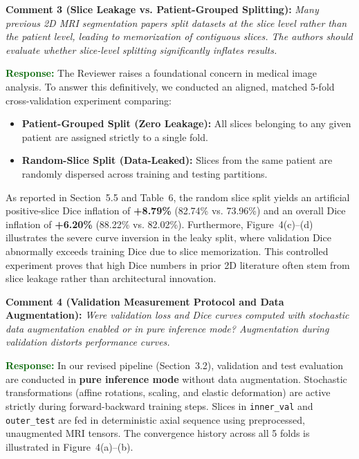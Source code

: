 \documentclass[11pt]{article}
\newcommand{\commentbox}[2]{%
\vspace{0.42em}\noindent
\textbf{\textcolor{NavyBlue}{#1:}} \textit{#2}\vspace{0.18em}%
}
\newcommand{\responsebox}[1]{%
\noindent
\textbf{\textcolor{DarkGreen}{Response:}} #1\vspace{0.42em}%
}
\begin{document}
\commentbox{Comment 3 (Slice Leakage vs. Patient-Grouped Splitting)}{Many previous 2D MRI segmentation papers split datasets at the slice level rather than the patient level, leading to memorization of contiguous slices. The authors should evaluate whether slice-level splitting significantly inflates results.}
\responsebox{The Reviewer raises a foundational concern in medical image analysis. To answer this definitively, we conducted an aligned, matched 5-fold cross-validation experiment comparing:
\begin{itemize}
    \item \textbf{Patient-Grouped Split (Zero Leakage):} All slices belonging to any given patient are assigned strictly to a single fold.
    \item \textbf{Random-Slice Split (Data-Leaked):} Slices from the same patient are randomly dispersed across training and testing partitions.
\end{itemize}
As reported in Section~5.5 and Table~6, the random slice split yields an artificial positive-slice Dice inflation of \textbf{+8.79\%} (82.74\% vs. 73.96\%) and an overall Dice inflation of \textbf{+6.20\%} (88.22\% vs. 82.02\%). Furthermore, Figure~4(c)--(d) illustrates the severe curve inversion in the leaky split, where validation Dice abnormally exceeds training Dice due to slice memorization. This controlled experiment proves that high Dice numbers in prior 2D literature often stem from slice leakage rather than architectural innovation.}

\commentbox{Comment 4 (Validation Measurement Protocol and Data Augmentation)}{Were validation loss and Dice curves computed with stochastic data augmentation enabled or in pure inference mode? Augmentation during validation distorts performance curves.}
\responsebox{In our revised pipeline (Section~3.2), validation and test evaluation are conducted in \textbf{pure inference mode} without data augmentation. Stochastic transformations (affine rotations, scaling, and elastic deformation) are active strictly during forward-backward training steps. Slices in \texttt{inner\_val} and \texttt{outer\_test} are fed in deterministic axial sequence using preprocessed, unaugmented MRI tensors. The convergence history across all 5 folds is illustrated in Figure~4(a)--(b).}
\end{document}
